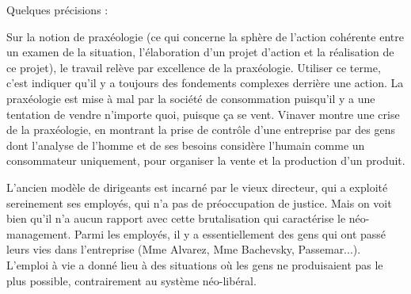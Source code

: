 \documentclass[a4paper,12pt]{book}
\begin{document}
\par Quelques précisions :
\par Sur la notion de praxéologie (ce qui concerne la sphère de l'action cohérente entre un examen de la situation, l'élaboration d'un projet d'action et la réalisation de ce projet), le travail relève par excellence de la praxéologie. Utiliser ce terme, c'est indiquer qu'il y a toujours des fondements complexes derrière une action. La praxéologie est mise à mal par la société de consommation puisqu'il y a une tentation de vendre n'importe quoi, puisque ça se vent. Vinaver montre une crise de la praxéologie, en montrant la prise de contrôle d'une entreprise par des gens dont l'analyse de l'homme et de ses besoins considère l'humain comme un consommateur uniquement, pour organiser la vente et la production d'un produit.
\par L'ancien modèle de dirigeants est incarné par le vieux directeur, qui a exploité sereinement ses employés, qui n'a pas de préoccupation de justice. Mais on voit bien qu'il n'a aucun rapport avec cette brutalisation qui caractérise le néo-management. Parmi les employés, il y a essentiellement des gens qui ont passé leurs vies dans l'entreprise (Mme Alvarez, Mme Bachevsky, Passemar...). L'emploi à vie a donné lieu à des situations où les gens ne produisaient pas le plus possible, contrairement au système néo-libéral.
\end{document}
